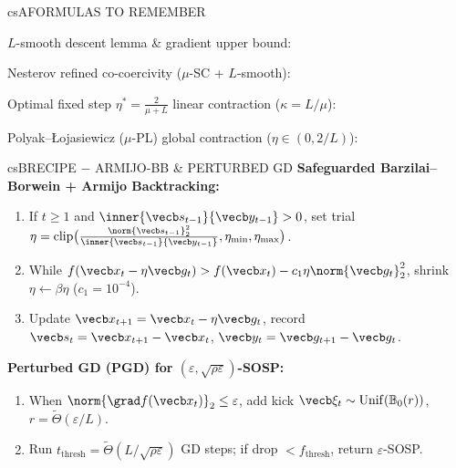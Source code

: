 \documentclass[../../../../master.tex]{subfiles}
\begin{document}
\begin{cscolumns}
\begin{cscard}{csA}{FORMULAS TO REMEMBER}
  \begin{csbul}
    \item $L$-smooth descent lemma \& gradient upper bound:
    \item Nesterov refined co-coercivity ($\mu$-SC + $L$-smooth):
    \item Optimal fixed step $\eta^*=\frac{2}{\mu+L}$ linear contraction ($\kappa=L/\mu$):
    \item Polyak--\L{}ojasiewicz ($\mu$-PL) global contraction ($\eta\in(0,2/L)$):
  \end{csbul}
\end{cscard}

\begin{cscard}{csB}{RECIPE $-$ ARMIJO-BB \& PERTURBED GD}
  \footnotesize
  \textbf{Safeguarded Barzilai--Borwein + Armijo Backtracking:}
  \begin{enumerate}[leftmargin=1.2em, itemsep=0.5pt, topsep=1pt, parsep=0pt]
    \item If $t\ge 1$ and $\inner{\vecb s_{t-1}}{\vecb y_{t-1}}>0$, set trial $\eta=\mathrm{clip}\bigl(\frac{\norm{\vecb s_{t-1}}_2^2}{\inner{\vecb s_{t-1}}{\vecb y_{t-1}}},\eta_{\min},\eta_{\max}\bigr)$.
    \item While $f(\vecb x_t-\eta\vecb g_t)>f(\vecb x_t)-c_1\eta\norm{\vecb g_t}_2^2$, shrink $\eta\gets\beta\eta$ ($c_1=10^{-4}$).
    \item Update $\vecb x_{t+1}=\vecb x_t-\eta\vecb g_t$, record $\vecb s_t=\vecb x_{t+1}-\vecb x_t$, $\vecb y_t=\vecb g_{t+1}-\vecb g_t$.
  \end{enumerate}
  \vspace{1pt}
  \textbf{Perturbed GD (PGD) for $(\varepsilon,\sqrt{\rho\varepsilon})$-SOSP:}
  \begin{enumerate}[leftmargin=1.2em, itemsep=0.5pt, topsep=1pt, parsep=0pt]
    \item When $\norm{\grad f(\vecb x_t)}_2\le\varepsilon$, add kick $\vecb\xi_t\sim\mathrm{Unif}(\mathbb B_0(r))$, $r=\tilde\Theta(\varepsilon/L)$.
    \item Run $t_{\mathrm{thresh}}=\tilde\Theta(L/\sqrt{\rho\varepsilon})$ GD steps; if drop $<f_{\mathrm{thresh}}$, return $\varepsilon$-SOSP.
  \end{enumerate}
\end{cscard}
\columnbreak


\end{cscolumns}
\end{document}
